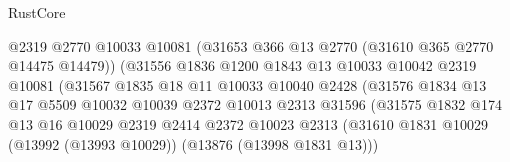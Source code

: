 \begin{lexlean}{RustCore}
\begin{coremodule}
                                          @2319
                                          @2770
                                          @10033
                                          @10081
                                          (@31653 @366 @13 @2770 (@31610 @365 @2770 @14475 @14479))
                                          (@31556
                                            @1836
                                            @1200
                                            @1843
                                            @13
                                            @10033
                                            @10042
                                            @2319
                                            @10081
                                            (@31567
                                              @1835
                                              @18
                                              @11
                                              @10033
                                              @10040
                                              @2428
                                              (@31576
                                                @1834
                                                @13
                                                @17
                                                @5509
                                                @10032
                                                @10039
                                                @2372
                                                @10013
                                                @2313
                                                @31596
                                                (@31575
                                                  @1832
                                                  @174
                                                  @13
                                                  @16
                                                  @10029
                                                  @2319
                                                  @2414
                                                  @2372
                                                  @10023
                                                  @2313
                                                  (@31610
                                                    @1831
                                                    @10029
                                                    (@13992 (@13993 @10029))
                                                    (@13876 (@13998 @1831 @13)))

\end{coremodule}
\end{lexlean}
